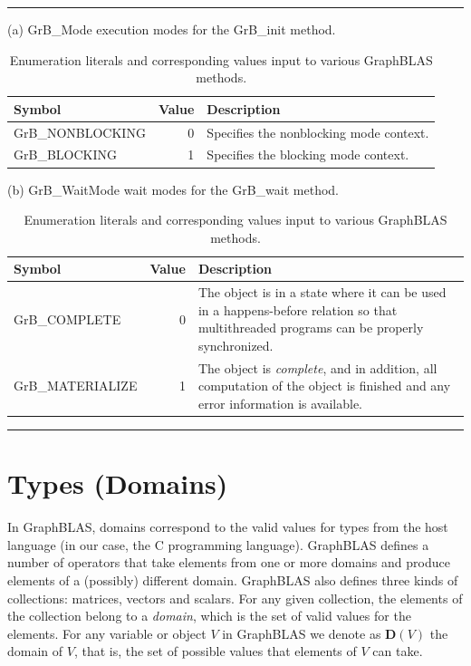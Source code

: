 \begin{table}[b!]
\hrule
\begin{center}
\caption{Enumeration literals and corresponding values input to various GraphBLAS methods.}
\label{Tab:EnumerationModes}

\vspace{1\baselineskip}
(a) {\sf GrB\_Mode} execution modes for the {\sf GrB\_init} method.
\vspace{1\baselineskip}

\begin{tabular}{l|r|p{4in}}
Symbol    & Value & Description \\ \hline
{\sf GrB\_NONBLOCKING}   &  0 & Specifies the nonblocking mode context.\\
{\sf GrB\_BLOCKING}      &  1 & Specifies the blocking mode context. \\
\end{tabular}

\vspace{2\baselineskip}
(b) {\sf GrB\_WaitMode} wait modes for the {\sf GrB\_wait} method.
\vspace{1\baselineskip}

\begin{tabular}{l|r|p{4in}}
Symbol    & Value & Description \\ \hline
{\sf GrB\_COMPLETE}    &  0 & The object is in a state where it can be used in a happens-before relation so that multithreaded programs can be properly synchronized.\\
{\sf GrB\_MATERIALIZE} &  1 & The object is \emph{complete}, and in addition, all computation of the object is finished and any error information is available. \\
\end{tabular}

\end{center}
\hrule
\end{table}

\section{Types (Domains)}
\label{Sec:Domains}

In GraphBLAS, domains correspond to the valid values for types from the
host language (in our case, the C programming language).  GraphBLAS defines
a number of operators that take elements from one or more domains and produce elements of a (possibly) different domain.  GraphBLAS also defines 
three kinds of collections: matrices, vectors and scalars.  For any given 
collection, the elements of the collection belong to a \emph{domain}, which 
is the set of valid values for the elements.  For any variable 
or object $V$ in GraphBLAS we denote as $\mathbf{D}(V)$ the domain of $V$,
that is, the set of possible values that elements of $V$ can take.  

